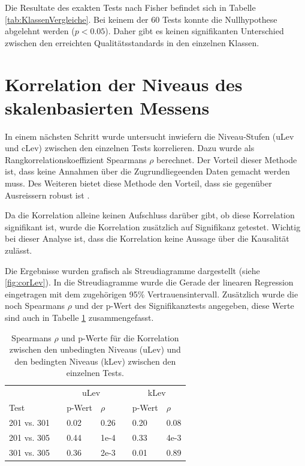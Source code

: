 Die Resultate des exakten Tests nach Fisher befindet sich in Tabelle \ref{tab:KlassenVergleiche}. Bei keinem der 60 Tests konnte die Nullhypothese abgelehnt werden ($p < 0.05$). Daher gibt es keinen signifikanten Unterschied zwischen den erreichten Qualitätsstandards in den einzelnen Klassen.  

\section{Korrelation der Niveaus des skalenbasierten Messens}

In einem nächsten Schritt wurde untersucht inwiefern die Niveau-Stufen (uLev und cLev) zwischen den einzelnen Tests korrelieren. Dazu wurde als Rangkorrelationskoeffizient Spearmans $\rho$ berechnet. Der Vorteil dieser Methode ist, dass keine Annahmen über die Zugrundliegeenden Daten gemacht werden muss. Des Weiteren bietet diese Methode den Vorteil, dass sie gegenüber Ausreissern robust ist \citep{Kowalski1972}. 

Da die Korrelation alleine keinen Aufschluss darüber gibt, ob diese Korrelation signifikant ist, wurde die Korrelation zusätzlich auf Signifikanz getestet. Wichtig bei dieser Analyse ist, dass die Korrelation keine Aussage über die Kausalität zulässt.


Die Ergebnisse wurden grafisch als Streudiagramme dargestellt (siehe \ref{fig:corLev}). In die Streudiagramme wurde die Gerade der linearen Regression eingetragen mit dem zugehörigen 95\% Vertrauensintervall. Zusätzlich wurde die noch Spearmans $\rho$ und der p-Wert des Signifikanztests angegeben, diese Werte sind auch in Tabelle \ref{tab:CorNiveau} zusammengefasst.



\begin{table}[htbp]
  \centering
\begin{tabular}{@{}lllllll@{}}
\toprule
 &&  \multicolumn{2}{c}{uLev} &&  \multicolumn{2}{c}{kLev}\\ 
 \cmidrule{3-4}  \cmidrule{6-7}
 Test && p-Wert & $\rho$ && p-Wert & $\rho$  \\ 
\midrule
 201 vs. 301 &&   0.02 & 0.26 && 0.20 & 0.08    \\ 
 201 vs. 305 &&   0.44 & 1e-4 && 0.33 & 4e-3      \\
 301 vs. 305 &&   0.36 & 2e-3 && 0.01 & 0.89    \\
\bottomrule
\end{tabular} 
  \caption{Spearmans $\rho$ und p-Werte für die Korrelation zwischen den unbedingten Niveaus (uLev) und den bedingten Niveaus (kLev) zwischen den einzelnen Tests.  }
  \label{tab:CorNiveau}
\end{table}
 
